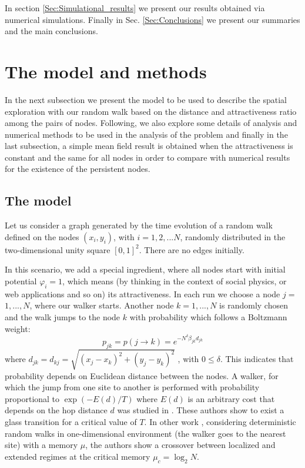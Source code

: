 \documentclass[3p, 11pt]{elsarticle}
\begin{document}
In section \ref{Sec:Simulational_results} we present our results obtained
via numerical simulations. Finally in Sec. \ref{Sec:Conclusions} we present
our summaries and the main conclusions.

\section{The model and methods}

\label{Sec:The_model_and_methods}

In the next subsection we present the model to be used to describe the
spatial exploration with our random walk based on the distance and
attractiveness ratio among the pairs of nodes. Following, we also explore
some details of analysis and numerical methods to be used in the analysis of
the problem and finally in the last subsection, a simple mean field result
is obtained when the attractiveness is constant and the same for all nodes
in order to compare with numerical results for the existence of the
persistent nodes.

\subsection{ The model}

\label{Sec:The model}

Let us consider a graph generated by the time evolution of a random walk
defined on the nodes $(x_{i},y_{i})$, with $i=1,2,...N$, randomly
distributed in the two-dimensional unity square $[0,1]^{2}$. There are no
edges initially.

In this scenario, we add a special ingredient, where all nodes start with
initial potential $\varphi _{i}=1$, which means (by thinking in the context
of social physics, or web applications and so on) its attractiveness. In
each run we choose a node $j=$ $1,...,N$, where our walker starts. Another
node $k=1,...,N$ is randomly chosen and the walk jumps to the node $k$ with
probability which follows a Boltzmann weight:%
\begin{equation}
p_{jk}=p(j\rightarrow k)=e^{-N^{\delta }\beta _{jk}d_{jk}}
\label{Eq:transition}
\end{equation}%
where $d_{jk}=d_{kj}=\sqrt{(x_{j}-x_{k})^{2}+(y_{j}-y_{k})^{2}}$ , with $%
0\leq \delta $. This indicates that probability depends on Euclidean
distance between the nodes. A walker, for which the jump from one site to
another is performed with probability proportional to $\exp (-E(d)/T)$ where 
$E(d)$ is an arbitrary cost that depends on the hop distance $d$ was studied
in \cite{MartinezI}. These authors show to exist a glass transition for a
critical value of $T$. In other work \cite{MartinezII}, considering
deterministic random walks in one-dimensional environment (the walker goes
to the nearest site) with a memory $\mu $, the authors show a crossover
between localized and extended regimes at the critical memory $\mu _{c}=\log
_{2}N$.
\end{document}
